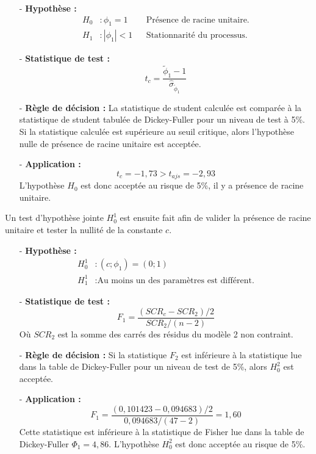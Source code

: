 \begin{itemize}
\item[-]\textbf{ Hypothèse :} 
\begin{align*}
        H_{0} &: \phi_{1} = 1  & &\text{Présence de racine unitaire.}\\
        H_{1} &:|\phi_{1}| < 1   &  &\text{Stationnarité du processus.}
\end{align*}
\item[-]\textbf{Statistique de test :} 
\begin{equation*}
    t_{c} = \frac{\tilde{\phi}_{1}- 1}{\hat{\sigma}_{\tilde{\phi}_{1}}}
\end{equation*}
\item[-]\textbf{Règle de décision :} La statistique de student calculée est comparée à la statistique de student tabulée de Dickey-Fuller pour un niveau de test à 
5\%. Si la statistique calculée est supérieure au seuil critique, alors l'hypothèse nulle de présence de racine unitaire est acceptée.
\item[-]\textbf{Application :} 
\begin{equation*}
    t_{c} = -1,73 > t_{ajs} = -2,93
\end{equation*}
L'hypothèse $H_{0}$ est donc acceptée au risque de 5\%, il y a présence de racine unitaire.
\end{itemize}
%
Un test d'hypothèse jointe $H_{0}^{1}$ est ensuite fait afin de valider la présence de racine unitaire et tester la nullité de la constante $c$.
\begin{itemize}
\item[-]\textbf{Hypothèse :} 
\begin{equation*}
    \begin{split}
        H_{0}^{1} &: (c; \phi_{1}) = (0;1)\\
        H_{1}^{1} &: \text{Au moins un des paramètres est différent.}
    \end{split}
\end{equation*}
\item[-]\textbf{Statistique de test :}
\begin{equation*}
    F_{1} = \frac{(SCR_{c} - SCR_{2})/2}{SCR_{2}/(n-2)}
\end{equation*}
Où $SCR_{2}$ est la somme des carrés des résidus du modèle 2 non contraint.
\item[-]\textbf{Règle de décision :}  Si la statistique $F_{2}$ est inférieure à la statistique lue dans la table de Dickey-Fuller pour un niveau de test de 5\%, alors 
$H_{0}^{2}$ est acceptée.
\item[-]\textbf{Application :} 
\begin{equation*}
    F_{1} = \frac{(0,101423 - 0,094683)/2}{0,094683/(47-2)} = 1,60
\end{equation*}
Cette statistique est inférieure à la statistique de Fisher lue dans la table de Dickey-Fuller $\Phi_{1} = 4,86$. L'hypothèse $H_{0}^{2}$ est donc acceptée au risque 
de 5\%. 
\end{itemize}
